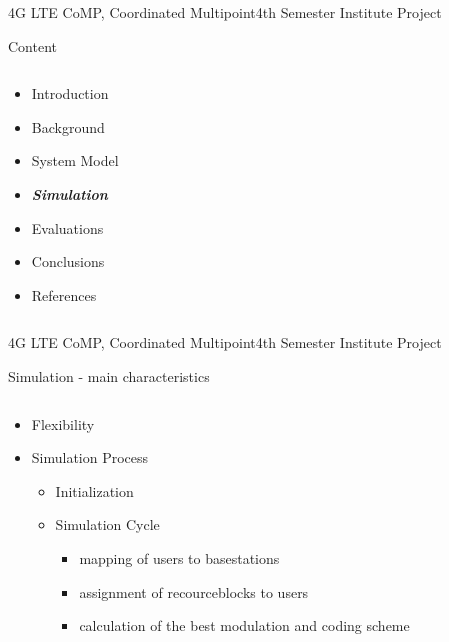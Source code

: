 \documentclass[xcolor={cmyk}]{beamer}
\begin{document}
\begin{frame}{4G LTE CoMP, Coordinated Multipoint}{4th Semester Institute Project}
	\begin{block}{Content}
		\begin{columns}
			\begin{column}{.9\textwidth}
				\begin{itemize}
					\item Introduction
					\item Background
					\item System Model
					\item \textbf{\emph{Simulation}}
					\item Evaluations
					\item Conclusions
					\item References
				\end{itemize}
			\end{column}
		\end{columns}
	\end{block}
\end{frame}

 \begin{frame}{4G LTE CoMP, Coordinated Multipoint}{4th Semester Institute Project}
	 \begin{block}{Simulation - main characteristics}
	 	\begin{columns}
			\begin{column}{.9\textwidth}
				\begin{itemize}
					\item Flexibility
					\item Simulation Process
					\begin{itemize}
						\item Initialization
						\item Simulation Cycle
						\begin{itemize}
							\item mapping of users to basestations
							\item assignment of recourceblocks to users
							\item calculation of the best modulation and coding scheme
					 	\end{itemize}
					 \end{itemize}
					
				 \end{itemize}
			\end{column}
		\end{columns}
	 \end{block}
 \end{frame}
 
\end{document}
